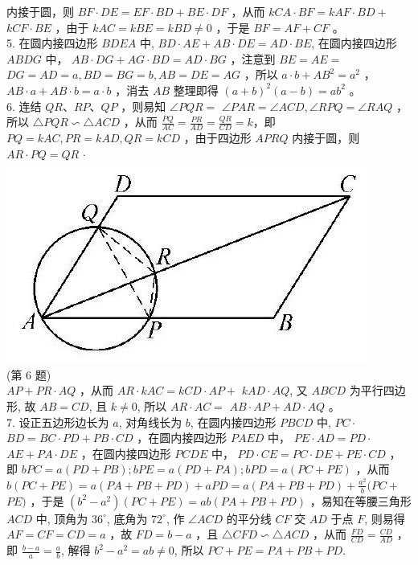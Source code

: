 \documentclass[10pt]{article}
\begin{document}
内接于圆，则 $B F \cdot D E=E F \cdot B D+B E \cdot D F$ ，从而 $k C A \cdot B F=k A F \cdot B D+$ $k C F \cdot B E$ ，由于 $k A C=k B E=k B D \neq 0$ ，于是 $B F=A F+C F$ 。\\
5. 在圆内接四边形 $B D E A$ 中, $B D \cdot A E+A B \cdot D E=A D \cdot B E$, 在圆内接四边形 $A B D G$ 中， $A B \cdot D G+A G \cdot B D=A D \cdot B G$ ，注意到 $B E=A E=$ $D G=A D=a, B D=B G=b, A B=D E=A G$ ，所以 $a \cdot b+A B^{2}=a^{2}$ ， $A B \cdot a+A B \cdot b=a \cdot b$ ，消去 $A B$ 整理即得 $(a+b)^{2}(a-b)=a b^{2}$ 。\\
6. 连结 $Q R 、 R P 、 Q P$ ，则易知 $\angle P Q R=$ $\angle P A R=\angle A C D, \angle R P Q=\angle R A Q$ ，所以 $\triangle P Q R \backsim \triangle A C D$ ，从而 $\frac{P Q}{A C}=\frac{P R}{A D}=\frac{Q R}{C D}=k ，$即 $P Q=k A C, P R=k A D, Q R=k C D$ ，由于四边形 $A P R Q$ 内接于圆，则 $A R \cdot P Q=Q R$ $\cdot$\\
\includegraphics[max width=\textwidth, center]{2024_10_30_66b8e5e701da2093c133g-103}\\
(第 6 题)\\
$A P+P R \cdot A Q$ ，从而 $A R \cdot k A C=k C D \cdot A P+$ $k A D \cdot A Q$, 又 $A B C D$ 为平行四边形, 故 $A B=C D$, 且 $k \neq 0$, 所以 $A R \cdot A C=$ $A B \cdot A P+A D \cdot A Q$ 。\\
7. 设正五边形边长为 $a$, 对角线长为 $b$, 在圆内接四边形 $P B C D$ 中, $P C \cdot$ $B D=B C \cdot P D+P B \cdot C D$ ，在圆内接四边形 $P A E D$ 中， $P E \cdot A D=P D \cdot$ $A E+P A \cdot D E$ ，在圆内接四边形 $P C D E$ 中， $P D \cdot C E=P C \cdot D E+P E \cdot C D$ ，即 $b P C=a(P D+P B) ; b P E=a(P D+P A) ; b P D=a(P C+P E)$ ，从而 $b(P C+P E)=a(P A+P B+P D)+a P D=a(P A+P B+P D)+\frac{a^{2}}{b}(P C+$ $P E)$ ，于是 $\left(b^{2}-a^{2}\right)(P C+P E)=a b(P A+P B+P D)$ ，易知在等腰三角形 $A C D$ 中, 顶角为 $36^{\circ}$, 底角为 $72^{\circ}$, 作 $\angle A C D$ 的平分线 $C F$ 交 $A D$ 于点 $F$, 则易得 $A F=C F=C D=a$ ，故 $F D=b-a$ ，且 $\triangle C F D \backsim \triangle A C D$ ，从而 $\frac{F D}{C D}=\frac{C D}{A D}$ ，即 $\frac{b-a}{a}=\frac{a}{b}$, 解得 $b^{2}-a^{2}=a b \neq 0$, 所以 $P C+P E=P A+P B+P D$.\\
\end{document}
